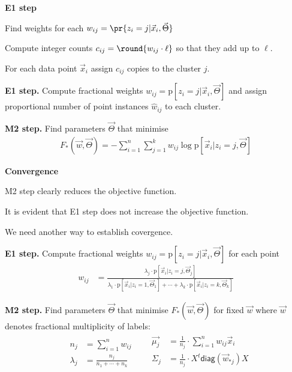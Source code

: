 \documentclass[landscape,footrule]{foils}
\newcommand\redsout{\bgroup\markoverwith{\textcolor{red}{\rule[0.3ex]{2pt}{4.0pt}}}\ULon}
\newcommand{\pd}[1]{\mathrm{p}[#1]}
\begin{document}
\textbf{E1 step} 
\begin{triangles}
\item Find weights for each $w_{ij}=\pr{z_i=j|\vec{x}_i,\vec{\Theta}}$
\item Compute integer counts $c_{ij}=\round{w_{ij}\cdot \ell}$ so that they add up to $\ell$.
\item For each data point $\vec{x}_i$ assign $c_{ij}$ copies to the cluster $j$.   
\end{triangles}


\textbf{E1 step.} Compute fractional weights $w_{ij}=\pd{z_i=j|\vec{x}_i,\vec{\Theta}}$ and assign proportional number of point instances $\hat{w}_{ij}$ to each cluster.  

\textbf{M2 step.} Find parameters $\vec{\Theta}$ that minimise 
\begin{align*}
F_*(\vec{w},\vec{\Theta}) =-\sum_{i=1}^n\sum_{j=1}^k w_{ij} \log\pd{\vec{x}_i|z_i=j,\vec{\Theta}}
\end{align*}


\textbf{Convergence}
\begin{triangles}
\item M2 step clearly reduces the objective function.
\item It is \redsout{not} evident that E1 step does not increase the objective function. 
\item We need another way to establish covergence. 
\end{triangles}

\enlargethispage{1cm}

\textbf{E1 step.} Compute fractional weights $w_{ij}=\pd{z_i=j|\vec{x}_i,\vec{\Theta}}$ for each point
\begin{align*}
w_{ij}&=\frac{\lambda_j\cdot\pd{\vec{x}_i|z_i=j,\vec{\Theta}_j}}{\lambda_1\cdot\pd{\vec{x}_i|z_i=1,\vec{\Theta}_1}+\cdots+\lambda_k\cdot\pd{\vec{x}_i|z_i=k,\vec{\Theta}_k}}
\end{align*}
\vspace*{0.5cm}  



\textbf{M2 step.} Find parameters $\vec{\Theta}$ that minimise $F_*(\vec{w},\vec{\Theta})$ for fixed $\vec{w}$ where $\vec{w}$ denotes fractional multiplicity of labels:
\begin{align*}
&\begin{aligned}
n_j&=\sum_{i=1}^n w_{ij}\\
\lambda_j&= \frac{n_j}{n_1+\cdots+n_k}
\end{aligned}
&&\begin{aligned}
\vec{\mu_{j}}&=\frac{1}{n_j}\cdot\sum_{i=1}^n w_{ij}\vec{x}_{i}\\
\Sigma_{j}&=\frac{1}{n_j}\cdot X^t \mathsf{diag}(\vec{w}_{*j})X\\
\end{aligned}
\end{align*}
\vspace*{-0.5cm}  
\end{document}
